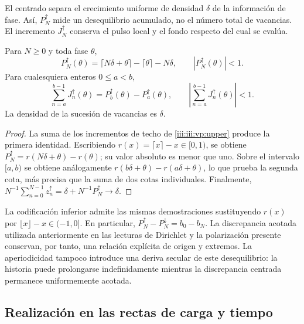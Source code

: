 El centrado separa el crecimiento uniforme de densidad $\delta$ de la
información de fase. Así, $P_N^{\uparrow}$ mide un desequilibrio acumulado,
no el número total de vacancias. El incremento $J_N^{\uparrow}$ conserva
el pulso local y el fondo respecto del cual se evalúa.

\begin{theorem}
Para $N\geq0$ y toda fase $\theta$,
\begin{equation}
 P_N^{\uparrow}(\theta)
 =\lceil N\delta+\theta\rceil-\lceil\theta\rceil-N\delta,
 \qquad |P_N^{\uparrow}(\theta)|<1.
 \label{iii:iii:vp:bound}
\end{equation}
Para cualesquiera enteros $0\leq a<b$,
\begin{equation}
 \sum_{n=a}^{b-1}J_n^{\uparrow}(\theta)
 =P_b^{\uparrow}(\theta)-P_a^{\uparrow}(\theta),
 \qquad
 \left|\sum_{n=a}^{b-1}J_n^{\uparrow}(\theta)\right|<1.
 \label{iii:iii:vp:continuity}
\end{equation}
La densidad de la sucesión de vacancias es $\delta$.
\end{theorem}
\begin{proof}
La suma de los incrementos de techo de \eqref{iii:iii:vp:upper} produce la
primera identidad. Escribiendo $r(x)=\lceil x\rceil-x\in[0,1)$,
se obtiene $P_N^{\uparrow}=r(N\delta+\theta)-r(\theta)$; su valor
absoluto es menor que uno. Sobre el intervalo $[a,b)$ se obtiene
análogamente $r(b\delta+\theta)-r(a\delta+\theta)$, lo que prueba
la segunda cota, más precisa que la suma de dos cotas individuales.
Finalmente,
$N^{-1}\sum_{n=0}^{N-1}z_n^{\uparrow}
=\delta+N^{-1}P_N^{\uparrow}\to\delta$.
\end{proof}

La codificación inferior admite las mismas demostraciones sustituyendo
$r(x)$ por $\lfloor x\rfloor-x\in(-1,0]$. En particular,
$P_N^{\uparrow}-P_N^{\downarrow}=b_0-b_N$. La discrepancia acotada
utilizada anteriormente en las lecturas de Dirichlet y la polarización
presente conservan, por tanto, una relación explícita de origen y extremos.
La aperiodicidad tampoco introduce una deriva secular de este desequilibrio:
la historia puede prolongarse indefinidamente mientras la discrepancia
centrada permanece uniformemente acotada.

\subsection{Realización en las rectas de carga y tiempo}

